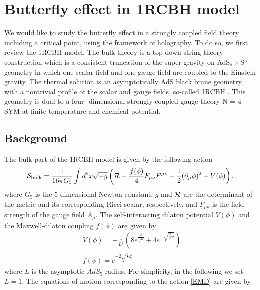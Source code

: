 \documentclass[preprintnumbers,aps,prd,longbibliography,nofootinbib,nobibnotes,amsmath,amssymb]{revtex4}
\begin{document}
\section{Butterfly effect in 1RCBH model }\label{sec2}
We would like to study the butterfly effect in a strongly coupled field theory including a critical point, using the framework of holography. To do so,  we first review the 1RCBH model.
The bulk theory is a top-down string theory construction which is a consistent truncation of the super-gravity on AdS$_5 \times$S$^5$ geometry in which one scalar field and one gauge field are coupled to the Einstein gravity. The thermal solution is an asymptotically AdS black brane geometry with a nontrivial profile of the scalar and gauge fields, so-called 1RCBH \cite{Gubser:1998jb, Cvetic:1999rb, Cvetic:1999ne}. This geometry is dual to a four-	dimensional strongly coupled gauge theory N = 4 SYM at finite temperature and chemical
	potential.

\subsection{Background}
 The bulk part of the 1RCBH model is given by the following  action \cite{Gubser:1998jb}
 \begin{align}\label{EMD}
{\cal{S}}_{\textrm{bulk}}=\frac{1}{16 \pi G_5}\int d^5x\sqrt{-g}\left({\cal{R}}-\frac{f(\phi)}{4}F_{\mu\nu}F^{\mu\nu}-\frac{1}{2}(\partial_\mu\phi)^2-V(\phi)\right),
\end{align}
where $G_5$ is the $5$-dimensional Newton constant, $g$ and ${\cal{R}}$ are the determinant of the metric and its corresponding Ricci scalar, respectively, and $F_{\mu\nu}$ is the field strength of the gauge field $A_{\mu}$. The self-interacting dilaton potential $V(\phi)$ and the Maxwell-dilaton coupling $f(\phi)$ are given by
\begin{align}
&V(\phi)=-\frac{1}{L^{2}}(8e^{\frac{\phi}{\sqrt{6}}}+4 e^{-\sqrt{\frac{2}{3}\phi}}) ,\\
& f(\phi)= e^{-2\sqrt{\frac{2}{3}\phi}}.
\end{align}
where $L$ is the asymptotic $AdS_5$ radius. For simplicity, in the following we set $L = 1$. 
The equations of motion corresponding to the action \eqref{EMD} are given by 
\end{document}
